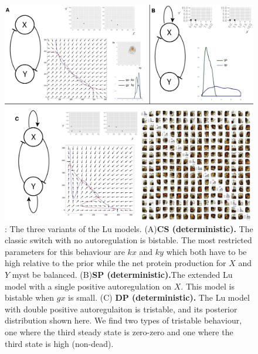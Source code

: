 {\begin{figure}[p]
\begin{center}
\includegraphics[width=\textwidth]{chapterStabilityFinder/images/lu_paper_post.png}
\caption[LoF caption]{ \label{fig:fig3}: The three variants of the Lu models. (A)\textbf{CS (deterministic).}  The classic switch with no autoregulation is bistable. The most restricted parameters for this behaviour are $kx$ and $ky$ which both have to be high relative to the prior while the net protein production for $X$ and $Y$ myst be balanced. (B)\textbf{SP (deterministic).}The extended Lu model with a single positive autoregulation on $X$. This model is bistable when $gx$ is small. (C) \textbf{DP (deterministic).} The Lu model with double positive autoregulaiton is tristable, and its posterior distribution shown here. We find two types of tristable behaviour, one where the third steady state is zero-zero and one where the third state is high (non-dead).}
\end{center}
\end{figure}
\clearpage




}
